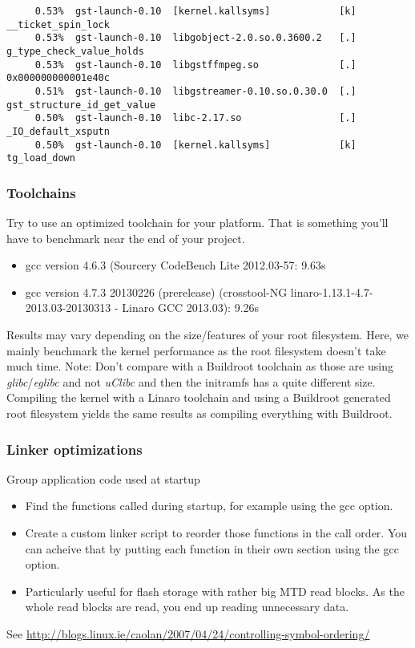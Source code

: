 \begin{frame}[fragile]
\begin{block}{}
\begin{verbatim}
     0.53%  gst-launch-0.10  [kernel.kallsyms]            [k] __ticket_spin_lock                           
     0.53%  gst-launch-0.10  libgobject-2.0.so.0.3600.2   [.] g_type_check_value_holds                     
     0.53%  gst-launch-0.10  libgstffmpeg.so              [.] 0x000000000001e40c                           
     0.51%  gst-launch-0.10  libgstreamer-0.10.so.0.30.0  [.] gst_structure_id_get_value                   
     0.50%  gst-launch-0.10  libc-2.17.so                 [.] _IO_default_xsputn                           
     0.50%  gst-launch-0.10  [kernel.kallsyms]            [k] tg_load_down                                 
\end{verbatim}
\end{block}
\end{frame}

\begin{frame}
\frametitle{Toolchains}
Try to use an optimized toolchain for your platform. That is something
you'll have to benchmark near the end of your project.
\begin{itemize}
        \item gcc version 4.6.3 (Sourcery CodeBench Lite 2012.03-57: 9.63s
        \item gcc version 4.7.3 20130226 (prerelease) (crosstool-NG
        linaro-1.13.1-4.7-2013.03-20130313 - Linaro GCC 2013.03): 9.26s
\end{itemize}
Results may vary depending on the size/features of your root filesystem.
Here, we mainly benchmark the kernel performance as the root filesystem
doesn't take much time. Note: Don't compare with a Buildroot toolchain as
those are using {\em glibc}/{\em eglibc} and not {\em uClibc} and then
the initramfs has a quite different size. Compiling the kernel with a
Linaro toolchain and using a Buildroot generated root filesystem yields
the same results as compiling everything with Buildroot.
\end{frame}

\begin{frame}
\frametitle{Linker optimizations}
Group application code used at startup
\begin{itemize}
        \item Find the functions called during startup, for example using
                the  gcc option.
        \item Create a custom linker script to reorder those functions in
                the call order. You can acheive that by putting each function
                in their own section using the  gcc
                option.
        \item Particularly useful for flash storage with rather big MTD
                read blocks. As the whole read blocks are read, you end up
                reading unnecessary data.
\end{itemize}
See \url{http://blogs.linux.ie/caolan/2007/04/24/controlling-symbol-ordering/}
\end{frame}

